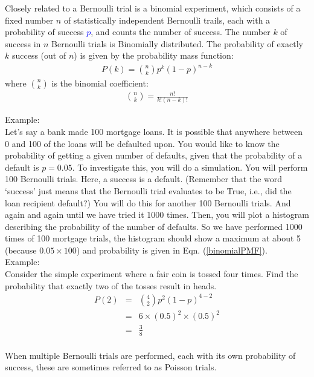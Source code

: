 Closely related to a Bernoulli trial is a binomial experiment, which consists of a fixed number $n$ of statistically independent Bernoulli trails, each with a probability of success \textcolor{blue}{$p$}, and counts the number of success. The number $k$ of success in $n$ Bernoulli trials is Binomially distributed. The probability of exactly $k$ success (out of $n$) is given by the probability mass function: 
\begin{eqnarray}
P(k) = \binom{n}{k} p^k (1-p)^{n-k}
\label{binomialPMF}
\end{eqnarray}
where $\binom{n}{k}$ is the binomial coefficient:
\begin{eqnarray}
\binom{n}{k} = \frac{n !}{k! (n-k)!}
\label{binomialcoef}
\end{eqnarray}

Example:\\
Let's say a bank made 100 mortgage loans. It is possible that anywhere between 0 and 100 of the loans will be defaulted upon. You would like to know the probability of getting a given number of defaults, given that the probability of a default is $p = 0.05$. To investigate this, you will do a simulation. You will perform 100 Bernoulli trials. Here, a success is a default. (Remember that the word `success' just means that the Bernoulli trial evaluates to be True, i.e., did the loan recipient default?) You will do this for another 100 Bernoulli trials. And again and again until we have tried it 1000 times. Then, you will plot a histogram describing the probability of the number of defaults. So we have performed 1000 times of 100 mortgage trials, the histogram should show a maximum at about 5 (because $0.05 \times 100$) and probability is given in Eqn. (\ref{binomialPMF}). \\   

Example:\\
Consider the simple experiment where a fair coin is tossed four times. Find the probability that exactly two of the tosses result in heads.\\
\begin{eqnarray*}
P(2) &=& \binom{4}{2}p^2 (1-p)^{4-2} \\ 
&=& 6 \times (0.5)^2 \times (0.5)^2 \\ 
&=& \frac{3}{8}\\ 
\label{coin}
\end{eqnarray*}

When multiple Bernoulli trials are performed, each with its own probability of success, these are sometimes referred to as Poisson trials.

